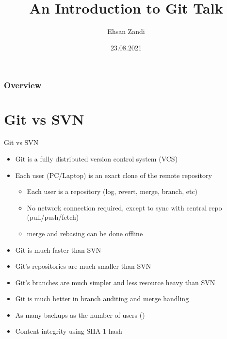 \documentclass{beamer}
\title[Short title]{An Introduction to Git Talk} %
\author{Ehsan Zandi} %
\institute[DTIT] %
{
Deutsche Telekom IT \\ %
\medskip
ehsan.zandi@telekom.de
}
\date{23.08.2021} %
\begin{document}
\begin{frame}
\titlepage %
\end{frame}

\begin{frame}
\frametitle{Overview} %
\tableofcontents %
\end{frame}


\section{Git vs SVN}


\begin{frame}{Git vs SVN}
\begin{itemize}
  \item Git is a fully distributed version control system (VCS)
  \item Each user (PC/Laptop) is an exact clone of the remote repository
    \begin{itemize}
      \item Each user is a repository (log, revert, merge, branch, etc)
      \item No network connection required, except to sync with central repo (pull/push/fetch)
      \item merge and rebasing can be done offline
    \end{itemize}
  \item Git is much faster than SVN
  \item Git's repositories are much smaller than SVN
  \item Git's branches are much simpler and less resource heavy than SVN
  \item Git is much better in branch auditing and merge handling
  \item As many backups as the number of users ()
  \item Content integrity using SHA-1 hash
  \end{itemize}
\end{frame}
\end{document}
